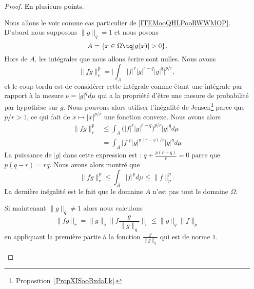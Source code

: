 \begin{proof}
	En plusieurs points.
	\begin{subproof}
		Nous allons le voir comme cas particulier de \ref{ITEMooQHLPooRWWMOP}.
		D'abord nous supposons \( \| g \|_q=1\) et nous posons
		\begin{equation}
			A=\{ x\in\Omega\tq | g(x) |>0 \}.
		\end{equation}
		Hors de \( A\), les intégrales que nous allons écrire sont nulles. Nous avons
		\begin{equation}
			\| fg \|_r^p=\Big|  \int_A| f |^r| g |^{r-q}| g |^q  \Big|^{p/r},
		\end{equation}
		et le coup tordu est de considérer cette intégrale comme étant une intégrale par rapport à la mesure \( \nu=| g |^qd\mu\) qui a la propriété d'être une mesure de probabilité par hypothèse sur \( g\). Nous pouvons alors utiliser l'inégalité de Jensen\footnote{Proposition~\ref{PropXISooBxdaLk}.} parce que \( p/r>1\), ce qui fait de \( x\mapsto | x |^{p/r}\) une fonction convexe. Nous avons alors
		\begin{subequations}
			\begin{align}
				\| fg \|_r^p & \leq\int_A\big( | f |^r| g |^{r-q} \big)^{p/r}| g |^qd\mu \\
				             & =\int_A| f |^{p}| g |^{p(r-q)/r}| g |^qd\mu
			\end{align}
		\end{subequations}
		La puissance de \( | g |\) dans cette expression est : \( q+\frac{ p(r-q) }{ r }=0\) parce que \( p(q-r)=rq\). Nous avons alors montré que
		\begin{equation}
			\| fg \|_r^p\leq \int_A| f |^pd\mu\leq \| f \|_p^p.
		\end{equation}
		La dernière inégalité est le fait que le domaine \( A\) n'est pas tout le domaine \( \Omega\).

		Si maintenant \( \| g \|_q\neq 1\) alors nous calculons
		\begin{equation}
			\| fg \|_r=\| g \|_q\| f\frac{ g }{ \| g \|_q } \|_r\leq \| g \|_q\| f \|_p
		\end{equation}
		en appliquant la première partie à la fonction \( \frac{ g }{ \| g \|_q }\) qui est de norme \( 1\).


\end{subproof}
\end{proof}
